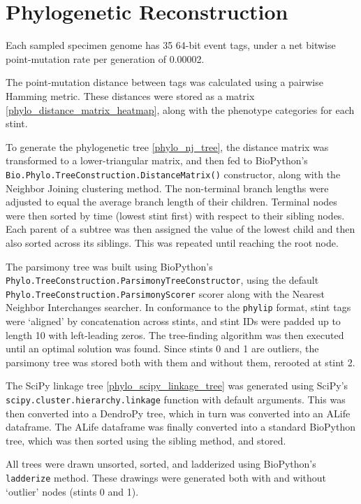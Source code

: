 \section{Phylogenetic Reconstruction}

Each sampled specimen genome has 35 64-bit event tags, under a net bitwise point-mutation rate per generation of 0.00002.

The point-mutation distance between tags was calculated using a pairwise Hamming metric.
These distances were stored as a matrix \ref{phylo_distance_matrix_heatmap}, along with the phenotype categories for each stint.

To generate the phylogenetic tree \ref{phylo_nj_tree}, the distance matrix was transformed to a lower-triangular matrix, and then fed to BioPython's \texttt{Bio.Phylo.TreeConstruction.DistanceMatrix()} constructor, along with the Neighbor Joining clustering method.
The non-terminal branch lengths were adjusted to equal the average branch length of their children.
Terminal nodes were then sorted by time (lowest stint first) with respect to their sibling nodes.
Each parent of a subtree was then assigned the value of the lowest child and then also sorted across its siblings.
This was repeated until reaching the root node.

The parsimony tree was built using BioPython's \texttt{Phylo.TreeConstruction.ParsimonyTreeConstructor}, using the default \texttt{Phylo.TreeConstruction.ParsimonyScorer} scorer along with the Nearest Neighbor Interchanges searcher.
In conformance to the \texttt{phylip} format, stint tags were `aligned' by concatenation across stints, and stint IDs were padded up to length 10 with left-leading zeros.
The tree-finding algorithm was then executed until an optimal solution was found.
Since stints 0 and 1 are outliers, the parsimony tree was stored both with them and without them, rerooted at stint 2.

The SciPy linkage tree \ref{phylo_scipy_linkage_tree} was generated using SciPy's \texttt{scipy.cluster.hierarchy.linkage} function with default arguments.
This was then converted into a DendroPy tree, which in turn was converted into an ALife dataframe.
The ALife dataframe was finally converted into a standard BioPython tree, which was then sorted using the sibling method, and stored.

All trees were drawn unsorted, sorted, and ladderized using BioPython's \texttt{ladderize} method.
These drawings were generated both with and without `outlier' nodes (stints 0 and 1).



